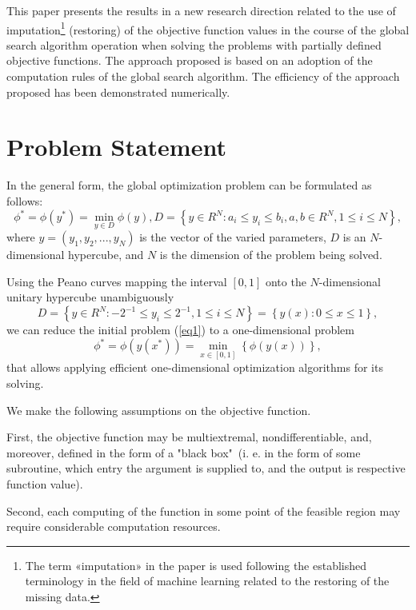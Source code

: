 \documentclass[runningheads]{llncs}
\begin{document}
This paper presents the results in a new research direction related to the use of imputation\footnote{The term «imputation» in the paper is used following the established terminology in the field of machine learning related to the restoring of the missing data.} (restoring) of the objective function values in the course of the global search algorithm operation when solving the problems with partially defined objective functions. The approach proposed is based on an adoption of the computation rules of the global search algorithm. The efficiency of the approach proposed has been demonstrated numerically.

\section{Problem Statement}
In the general form, the global optimization problem can be formulated as follows:
\begin{equation}\label{eq1} 
\phi^*=\phi(y^* )=\min_{y \in D} \phi(y), D=\left\{ y \in R^N: a_i \leq y_i \leq b_i, a,b \in R^N,1 \leq i \leq N \right\},
\end{equation}
where $y=(y_1,y_2,...,y_N)$ is the vector of the varied parameters, $D$ is an $N$-dimensional hypercube, and $N$ is the dimension of the problem being solved.

Using the Peano curves mapping the interval $[0,1]$ onto the $N$-dimensional unitary hypercube unambiguously
$$
D=\left\{ y \in R^N: -2^{-1} \leq y_i \leq 2^{-1}, 1 \leq i \leq N \right\} = \left\{ y(x): 0 \leq x \leq 1 \right\},
$$
we can reduce the initial problem (\ref{eq1}) to a one-dimensional problem
\begin{equation}\label{eq2} 
\phi^*=\phi(y(x^* ))=\min_{x \in [0,1]} \left\{ \phi(y(x)) \right\},
\end{equation}
that allows applying efficient one-dimensional optimization algorithms for its solving.

We make the following assumptions on the objective function. 

First, the objective function may be multiextremal, nondifferentiable, and, moreover, defined in the form of a "black box"\ (i. e. in the form of some subroutine, which entry the argument is supplied to, and the output is respective function value).

Second, each computing of the function in some point of the feasible region may require considerable computation resources.
\end{document}
